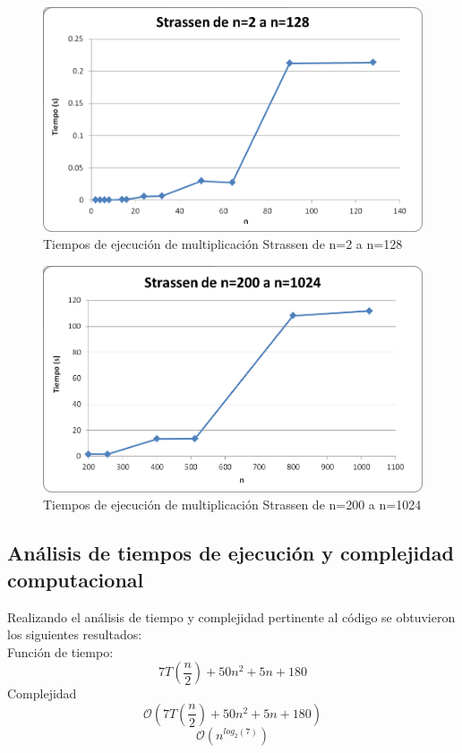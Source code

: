 \documentclass[12pt,letterpaper]{article}
\begin{document}
\begin{figure}[H]
	\centering
	\includegraphics[scale=0.6]{s2-128.png}
	\caption{Tiempos de ejecución de multiplicación Strassen de n=2 a n=128}
	\label{fig:tiempoC}
\end{figure}

\begin{figure}[H]
	\centering
	\includegraphics[scale=0.6]{s200-1024.png}
	\caption{Tiempos de ejecución de multiplicación Strassen de n=200 a n=1024}
	\label{fig:tiempoC}
\end{figure}
\newpage
\subsection{Análisis de tiempos de ejecución y complejidad computacional}
Realizando el análisis de tiempo y complejidad pertinente al código se obtuvieron los siguientes resultados:\\
\indent Función de tiempo:
\begin{equation}
	7 T \left(\frac{n}{2}\right) + 50n^{2} + 5n +180
\end{equation}
\indent Complejidad
\begin{equation}
	\mathcal{O}\left(7 T \left(\frac{n}{2}\right) + 50n^{2} + 5n +180 \right)
\end{equation}
\begin{equation}
	\mathcal{O}\left(n^{log_{2}(7)}\right)
\end{equation}
\end{document}
